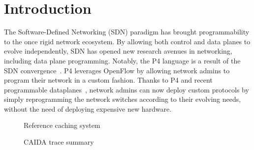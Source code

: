 \section{Introduction}\label{sec:intro}

The Software-Defined Networking (SDN) paradigm has brought programmability to the once rigid network ecosystem.
By allowing both control and data planes to evolve independently, SDN has opened new research avenues in networking, including data plane programming.
Notably, the P4 language is a result of the SDN convergence~\cite{Bosshart:14}.
P4 leverages OpenFlow by allowing network admins to program their network in a custom fashion.
Thanks to P4 and recent programmable dataplanes~\cite{Bosshart:13}, network admins can now deploy custom protocols by simply reprogramming the network switches according to their evolving needs, without the need of deploying expensive new hardware. 

\begin{figure}[]
	\centering
	
	\caption{Reference caching system}
	\label{fig:high_level_network}
\end{figure}

\begin{figure}[]
	\centering
	\caption{CAIDA trace summary}
	\label{fig:traces}
\end{figure}


